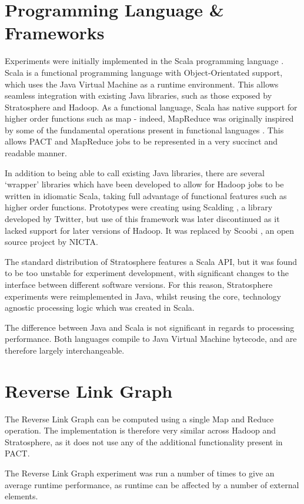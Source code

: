 \section{Programming Language \& Frameworks}
Experiments were initially implemented in the Scala programming language \cite{scalalang}. Scala is a functional programming language with Object-Orientated support, which uses the Java Virtual Machine as a runtime environment. This allows seamless integration with existing Java libraries, such as those exposed by Stratosphere and Hadoop. As a functional language, Scala has native support for higher order functions such as map - indeed, MapReduce was originally inspired by some of the fundamental operations present in functional languages \cite{dean2008mapreduce}. This allows PACT and MapReduce jobs to be represented in a very succinct and readable manner. 

In addition to being able to call existing Java libraries, there are several `wrapper' libraries which have been developed to allow for Hadoop jobs to be written in idiomatic Scala, taking full advantage of functional features such as higher order functions. Prototypes were creating using Scalding \cite{scalding}, a library developed by Twitter, but use of this framework was later discontinued as it lacked support for later versions of Hadoop. It was replaced by Scoobi \cite{scoobi}, an open source project by NICTA.

The standard distribution of Stratosphere features a Scala API, but it was found to be too unstable for experiment development, with significant changes to the interface between different software versions. For this reason, Stratosphere experiments were reimplemented in Java, whilst reusing the core, technology agnostic processing logic which was created in Scala. 

The difference between Java and Scala is not significant in regards to processing performance. Both languages compile to Java Virtual Machine bytecode, and are therefore largely interchangeable. 
\section{Reverse Link Graph}
The Reverse Link Graph can be computed using a single Map and Reduce operation. The implementation is therefore very similar across Hadoop and Stratosphere, as it does not use any of the additional functionality present in PACT.

The Reverse Link Graph experiment was run a number of times to give an average runtime performance, as runtime can be affected by a number of external elements. 

